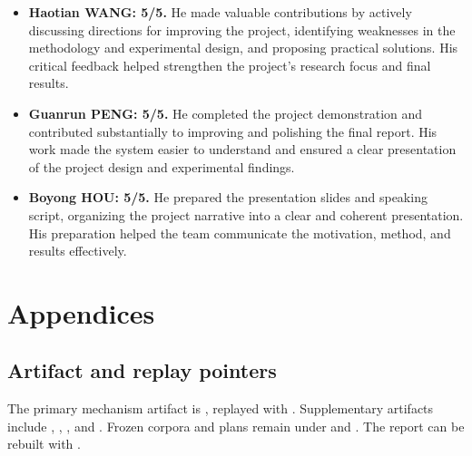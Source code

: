 \documentclass[journal]{IEEEtran}
\begin{document}
\begin{itemize}
    
    \item \textbf{Haotian WANG: 5/5.}
    He made valuable contributions by actively discussing directions for
    improving the project, identifying weaknesses in the methodology and
    experimental design, and proposing practical solutions. His critical
    feedback helped strengthen the project's research focus and final
    results.

    \item \textbf{Guanrun PENG: 5/5.}
    He completed the project demonstration and contributed substantially to
    improving and polishing the final report. His work made the system easier
    to understand and ensured a clear presentation of the project design and
    experimental findings.

    \item \textbf{Boyong HOU: 5/5.}
    He prepared the presentation slides and speaking script, organizing the
    project narrative into a clear and coherent presentation. His preparation
    helped the team communicate the motivation, method, and results
    effectively.
\end{itemize}



\clearpage



\newpage
\section*{Appendices}

\subsection*{Artifact and replay pointers}

{\raggedright
The primary mechanism artifact is
, replayed with
. Supplementary artifacts include
,
,
, and
. Frozen corpora and plans
remain under  and . The report can be
rebuilt with .\par}
\end{document}
